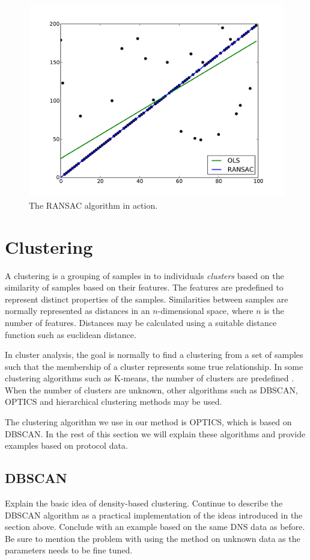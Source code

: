 \documentclass[a4paper]{report}
\begin{document}
\begin{figure}[h]
    \includegraphics[width=\linewidth]{ransac}
    \caption{The RANSAC algorithm in action.}
    \label{fig:ransac}
\end{figure}

\section{Clustering}
A clustering is a grouping of samples in to individuals \textit{clusters}
based on the similarity of samples based on their features. The features are
predefined to represent distinct properties of the samples. Similarities
between samples are normally represented as distances in an $n$-dimensional
space, where $n$ is the number of features. Distances may be calculated using
a suitable distance function such as euclidean distance. 

In cluster analysis, the goal is normally to find a clustering from a
set of samples such that the membership of a cluster represents some true
relationship. In some clustering algorithms such as K-means, the number of
clusters are predefined \cite{macqueen67}.
When the number of clusters are unknown, other algorithms such as DBSCAN,
OPTICS and hierarchical clustering methods may be used.

The clustering algorithm we use in our method is OPTICS, which is based on
DBSCAN. In the rest of this section we will explain these algorithms and
provide examples based on protocol data.

\subsection{DBSCAN}
Explain the basic idea of density-based clustering. Continue to describe the
DBSCAN algorithm as a practical implementation of the ideas introduced in the
section above. Conclude with an example based on the same DNS data as before.
Be sure to mention the problem with using the method on unknown data as the
parameters needs to be fine tuned.
\end{document}
